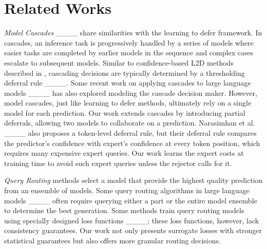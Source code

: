 \section{Related Works}
\label{sec:relworks}

\textit{Model Cascades} ____ share similarities with the learning to defer framework. In cascades, an inference task is progressively handled by a series of models where easier tasks are completed by earlier models in the sequence and complex cases escalate to subsequent models. Similar to confidence-based L2D methods described in , cascading decisions are typically determined by a thresholding deferral rule ____. Some recent work on applying cascades to large language models ____ has also explored modeling the cascade decision maker. However, model cascades, just like learning to defer methods, ultimately rely on a single model for each prediction. Our work extends cascades by introducing partial deferrals, allowing two models to collaborate on a prediction. Narasimhan et al. ____ also proposes a token-level deferral rule, but their deferral rule compares the predictor's confidence with expert's confidence at every token position, which requires many expensive expert queries. Our work learns the expert costs at training time to avoid such expert queries unless the rejector calls for it.

\textit{Query Routing} methods select a model that provide the highest quality prediction from an ensemble of models. Some query routing algorithms in large language models ____ often require querying either a part or the entire model ensemble to determine the best generation. Some methods train query routing models using specially designed loss functions ____; these loss functions, however, lack consistency guarantees. Our work not only presents surrogate losses with stronger statistical guarantees but also offers more granular routing decisions.

